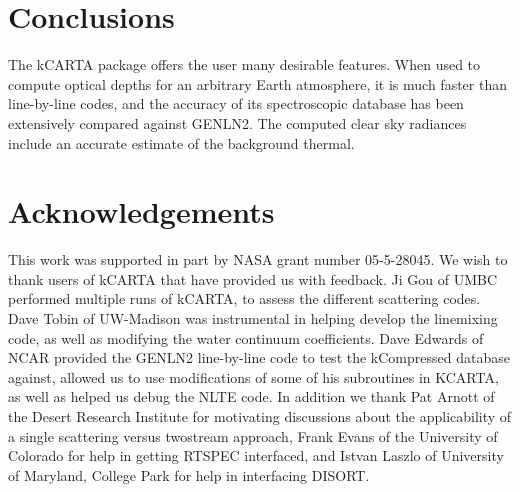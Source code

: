 \documentclass[11pt]{article}
\newcommand{\kc}{\textsf{kCARTA}\xspace}
\begin{document}


\section{Conclusions}
The \textsf{kCARTA} package offers the user many desirable features. When used
to compute optical depths for an arbitrary Earth atmosphere, it is much faster
than line-by-line codes, and the accuracy of its spectroscopic database has 
been extensively compared  against \textsf{GENLN2}. The computed clear sky 
radiances include an accurate estimate of the background thermal. 

\section{Acknowledgements}
This work was supported in part by NASA grant number 05-5-28045. We wish to 
thank users of kCARTA that have provided us with feedback. Ji Gou of UMBC 
performed multiple runs of \kc, to assess the different scattering codes. 
Dave Tobin of UW-Madison was instrumental in helping develop the \cd 
linemixing code, as well as modifying the water continuum coefficients. Dave 
Edwards of NCAR provided the {\sf GENLN2} line-by-line code to test the 
{\sf kCompressed} database against, allowed us to use modifications of some of 
his subroutines in {\sf KCARTA}, as well as helped us debug the NLTE code. 
In addition we thank Pat Arnott of the 
Desert Research Institute for motivating discussions about the applicability 
of a single scattering versus twostream approach, Frank Evans of the 
University of Colorado for help in getting RTSPEC interfaced, and Istvan 
Laszlo of University of Maryland, College Park for help in interfacing 
DISORT.



\end{document}
